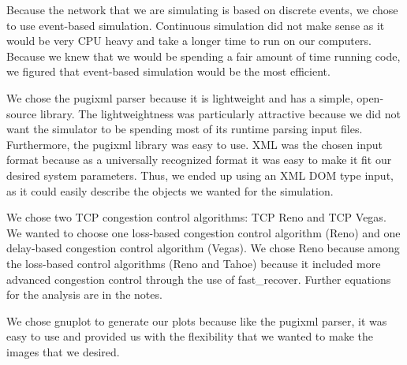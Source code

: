 \documentclass{article}
\begin{document}
    Because the network that we are simulating is based on discrete events, we chose to use event-based simulation. Continuous simulation did not make sense as it would be very CPU heavy and take a longer time to run on our computers. Because we knew that we would be spending a fair amount of time running code, we figured that event-based simulation would be the most efficient.

    We chose the pugixml parser because it is lightweight and has a simple, open-source library. The lightweightness was particularly attractive because we did not want the simulator to be spending most of its runtime parsing input files. Furthermore, the pugixml library was easy to use. XML was the chosen input format because as a universally recognized format it was easy to make it fit our desired system parameters. Thus, we ended up using an XML DOM type input, as it could easily describe the objects we wanted for the simulation.

    We chose two TCP congestion control algorithms: TCP Reno and TCP Vegas. We wanted to choose one loss-based congestion control algorithm (Reno) and one delay-based congestion control algorithm (Vegas). We chose Reno because among the loss-based control algorithms (Reno and Tahoe) because it included more advanced congestion control through the use of fast\_recover. Further equations for the analysis are in the notes. 
    
    We chose gnuplot to generate our plots because like the pugixml parser, it was easy to use and provided us with the flexibility that we wanted to make the images that we desired. 













\end{document}
